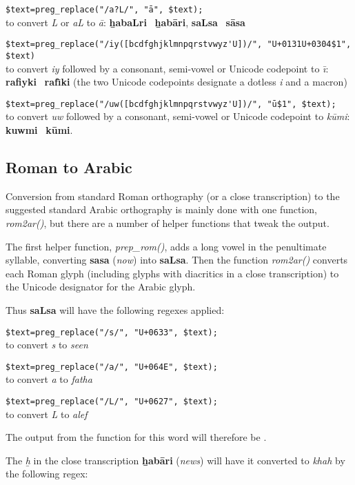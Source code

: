 \verb|$text=preg_replace("/a?L/", "ā", $text);|\\
to convert \textit{L} or \textit{aL} to \textit{ā}: \textbf{ẖabaLri} \textrightarrow\ \textbf{ẖabāri}, \textbf{saLsa} \textrightarrow\ \textbf{sāsa}

\verb|$text=preg_replace("/iy([bcdfghjklmnpqrstvwyz'U])/", "U+0131U+0304$1", $text)|\\
to convert \textit{iy} followed by a consonant, semi-vowel or Unicode codepoint to \textit{ı̄}: \textbf{rafiyki} \textrightarrow\ \textbf{rafı̄ki} (the two Unicode codepoints designate a dotless \textit{i} and a macron)

\verb|$text=preg_replace("/uw([bcdfghjklmnpqrstvwyz'U])/", "ū$1", $text);|\\
to convert \textit{uw} followed by a consonant, semi-vowel or Unicode codepoint to \textit{kūmi}: \textbf{kuwmi} \textrightarrow\ \textbf{kūmi}.

\subsection{Roman to Arabic}

Conversion from standard Roman orthography (or a close transcription) to the suggested standard Arabic orthography is mainly done with one function, \textit{rom2ar()}, but there are a number of helper functions that tweak the output.

The first helper function, \textit{prep\_rom()}, adds a long vowel in the penultimate syllable, converting \textbf{sasa} (\textit{now}) into \textbf{saLsa}.  Then the function \textit{rom2ar()} converts each Roman glyph (including glyphs with diacritics in a close transcription) to the Unicode designator for the Arabic glyph.

Thus \textbf{saLsa} will have the following regexes applied:

\verb|$text=preg_replace("/s/", "U+0633", $text);|\\
to convert \textit{s} to \textit{seen}

\verb|$text=preg_replace("/a/", "U+064E", $text);|\\
to convert \textit{a} to \textit{fatha}

\verb|$text=preg_replace("/L/", "U+0627", $text);|\\
to convert \textit{L} to \textit{alef}

The output from the function for this word will therefore be .

The \textit{ẖ} in the close transcription \textbf{ẖabāri} (\textit{news}) will have it converted to \textit{khah} by the following regex:

